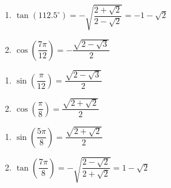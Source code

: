 \begin{multicols}{2}

\begin{enumerate}

\setcounter{enumi}{\value{HW}}

\item $\tan(112.5^{\circ}) = - \sqrt{\dfrac{2+\sqrt{2}}{2-\sqrt{2}}} = -1 - \sqrt{2}$
\item $\cos\left( \dfrac{7\pi}{12} \right) = -\dfrac{\sqrt{2-\sqrt{3}}}{2}$  

\setcounter{HW}{\value{enumi}}

\end{enumerate}

\end{multicols}

\begin{multicols}{2}

\begin{enumerate}

\setcounter{enumi}{\value{HW}}

\item $\sin\left( \dfrac{\pi}{12} \right) = \dfrac{\sqrt{2-\sqrt{3}}}{2}$ 
\item $\cos \left( \dfrac{\pi}{8} \right) = \dfrac{\sqrt{2 + \sqrt{2}}}{2}$

\setcounter{HW}{\value{enumi}}

\end{enumerate}

\end{multicols}

\begin{multicols}{2}

\begin{enumerate}

\setcounter{enumi}{\value{HW}}

\item $\sin \left( \dfrac{5\pi}{8} \right) = \dfrac{\sqrt{2 + \sqrt{2}}}{2}$
\item $\tan \left( \dfrac{7\pi}{8} \right) = -\sqrt{ \dfrac{2 - \sqrt{2}}{2 + \sqrt{2}} } =1-\sqrt{2}$

\setcounter{HW}{\value{enumi}}

\end{enumerate}

\end{multicols}

